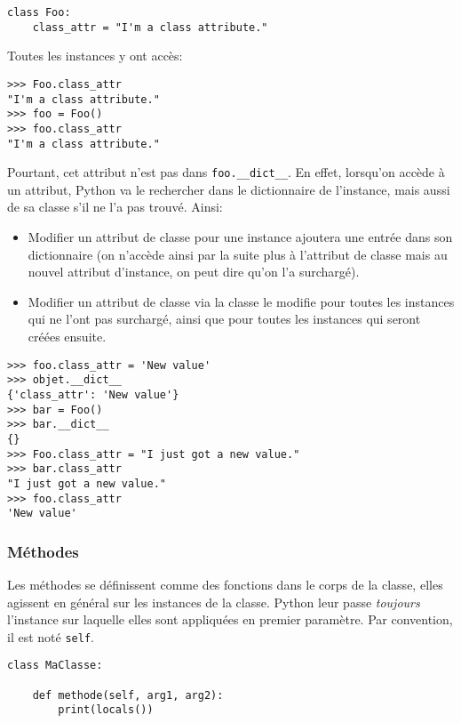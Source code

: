 \begin{verbatim}
class Foo:
    class_attr = "I'm a class attribute."
\end{verbatim}

Toutes les instances y ont accès:

\begin{verbatim}
>>> Foo.class_attr
"I'm a class attribute."
>>> foo = Foo()
>>> foo.class_attr
"I'm a class attribute."
\end{verbatim}

Pourtant, cet attribut n'est pas dans \texttt{foo.__dict__}. En effet, lorsqu'on accède à un attribut,
Python va le rechercher dans le dictionnaire de l'instance, mais aussi de sa classe s'il ne l'a pas trouvé. Ainsi:

\begin{itemize}
    \item Modifier un attribut de classe pour une instance ajoutera une entrée dans son dictionnaire (on n'accède ainsi
    par la suite plus à l'attribut de classe mais au nouvel attribut d'instance, on peut dire qu'on l'a surchargé).
    \item Modifier un attribut de classe via la classe le modifie pour toutes les instances qui ne l'ont pas surchargé,
    ainsi que pour toutes les instances qui seront créées ensuite.
\end{itemize}

\begin{verbatim}
>>> foo.class_attr = 'New value'
>>> objet.__dict__
{'class_attr': 'New value'}
>>> bar = Foo()
>>> bar.__dict__
{}
>>> Foo.class_attr = "I just got a new value."
>>> bar.class_attr
"I just got a new value."
>>> foo.class_attr
'New value'
\end{verbatim}

\subsubsection{Méthodes}
Les méthodes se définissent comme des fonctions dans le corps de la classe, elles agissent en général sur les instances de la classe. Python leur passe \emph{toujours} l'instance sur laquelle elles sont appliquées en premier paramètre. Par convention,
il est noté \texttt{self}.

\begin{verbatim}
class MaClasse:

    def methode(self, arg1, arg2):
        print(locals())
\end{verbatim}

